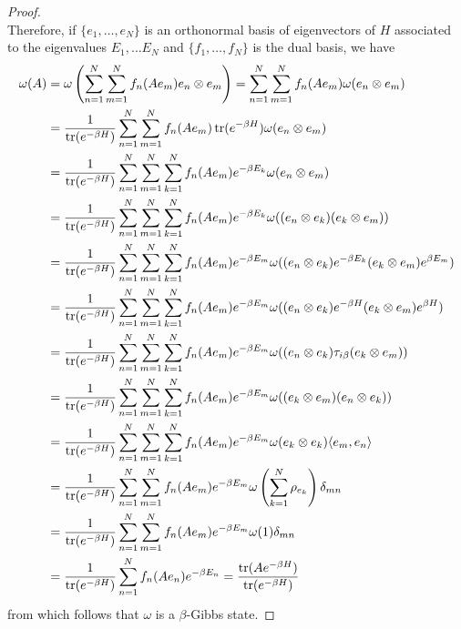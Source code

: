 \begin{proof}
\begin{equation}
\end{equation}
Therefore, if $\{e_1,\dots ,e_N\}$ is an orthonormal basis of eigenvectors of $H$ associated to the eigenvalues $E_1,\dots E_N$ and $\{f_1,\dots,f_N\}$ is the dual basis, we have
\begin{align}
\begin{split}
\omega(A)&=\omega\left(\sum_{n=1}^N\sum_{m=1}^N f_n(Ae_m)e_n\otimes e_m\right)=\sum_{n=1}^N\sum_{m=1}^Nf_n(Ae_m)\omega(e_n\otimes e_m) \\
&=\frac{1}{\operatorname{tr}(e^{-\beta H})}\sum_{n=1}^N\sum_{m=1}^Nf_n(Ae_m)\operatorname{tr}(e^{-\beta H})\omega(e_n \otimes e_m) \\
&=\frac{1}{\operatorname{tr}(e^{-\beta H})}\sum_{n=1}^N\sum_{m=1}^N\sum_{k=1}^Nf_n(Ae_m)e^{-\beta E_k}\omega(e_n\otimes e_m) \\
&=\frac{1}{\operatorname{tr}(e^{-\beta H})}\sum_{n=1}^N\sum_{m=1}^N\sum_{k=1}^Nf_n(Ae_m)e^{-\beta E_k}\omega((e_n\otimes e_k)( e_k\otimes e_m)) \\
&=\frac{1}{\operatorname{tr}(e^{-\beta H})}\sum_{n=1}^N\sum_{m=1}^N\sum_{k=1}^Nf_n(Ae_m)e^{-\beta E_m}\omega((e_n\otimes e_k) e^{-\beta E_k} (e_k\otimes e_m) e^{\beta E_m}) \\
&=\frac{1}{\operatorname{tr}(e^{-\beta H})}\sum_{n=1}^N\sum_{m=1}^N\sum_{k=1}^Nf_n(Ae_m)e^{-\beta E_m}\omega((e_n\otimes e_k) e^{-\beta H} (e_k\otimes e_m) e^{\beta H}) \\
&=\frac{1}{\operatorname{tr}(e^{-\beta H})}\sum_{n=1}^N\sum_{m=1}^N\sum_{k=1}^Nf_n(Ae_m)e^{-\beta E_m}\omega((e_n\otimes e_k) \tau_{i\beta} (e_k\otimes e_m)) \\
&=\frac{1}{\operatorname{tr}(e^{-\beta H})}\sum_{n=1}^N\sum_{m=1}^N\sum_{k=1}^Nf_n(Ae_m)e^{-\beta E_m}\omega( (e_k\otimes e_m)( e_n\otimes e_k))\\
&=\frac{1}{\operatorname{tr}(e^{-\beta H})}\sum_{n=1}^N\sum_{m=1}^N\sum_{k=1}^Nf_n(Ae_m)e^{-\beta E_m}\omega( e_k\otimes e_k)\langle e_m,e_n\rangle\\
&=\frac{1}{\operatorname{tr}(e^{-\beta H})}\sum_{n=1}^N\sum_{m=1}^Nf_n(Ae_m)e^{-\beta E_m}\omega\left(\sum_{k=1}^N \rho_{e_k}\right)\delta_{mn}\\
&=\frac{1}{\operatorname{tr}(e^{-\beta H})}\sum_{n=1}^N\sum_{m=1}^Nf_n(Ae_m)e^{-\beta E_m}\omega(1)\delta_{mn} \\
&=\frac{1}{\operatorname{tr}(e^{-\beta H})}\sum_{n=1}^Nf_n(Ae_n)e^{-\beta E_n} =\frac{\operatorname{tr}(Ae^{-\beta H})}{\operatorname{tr}(e^{-\beta H})}
\end{split}
\end{align}
from which follows that $\omega$ is a $\beta$-Gibbs state.
\end{proof}